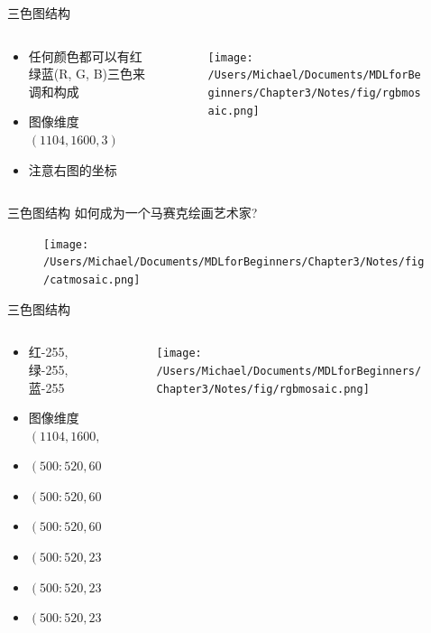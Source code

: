 \documentclass[handout]{beamer}
\begin{document}
\begin{frame}{三色图结构}
\begin{columns}
	\begin{column}{0.25\textwidth}
		\begin{itemize}
			\item \footnotesize{任何颜色都可以有红绿蓝(R, G, B)三色来调和构成}
			\item \footnotesize{图像维度 $(1104, 1600, 3)$}
			\item 注意右图的坐标
		\end{itemize}
	\end{column}
	\begin{column}{0.65\textwidth}
		\begin{figure}[H]
	\texttt{[image: /Users/Michael/Documents/MDLforBeginners/Chapter3/Notes/fig/rgbmosaic.png]}
\end{figure}	
	\end{column}
\end{columns}
\end{frame}

\begin{frame}{三色图结构}
	如何成为一个马赛克绘画艺术家?
	\begin{figure}[H]
		\centering
		\texttt{[image: /Users/Michael/Documents/MDLforBeginners/Chapter3/Notes/fig/catmosaic.png]}
	\end{figure}
\end{frame}

\begin{frame}{三色图结构}
\begin{columns}
	\begin{column}{0.35\textwidth}
		\begin{itemize}
			\item \footnotesize{红-255, 绿-255, 蓝-255}
			\item \footnotesize{图像维度 $(1104, 1600, 3)$}
			\item $(500:520, 600:620, 0)$
			\item $(500:520, 600:620, 1)$
			\item $(500:520, 600:620, 2)$
			\item $(500:520, 230:250, 0)$
			\item $(500:520, 230:250, 1)$
			\item $(500:520, 230:250, 2)$
		\end{itemize}
	\end{column}
	\begin{column}{0.65\textwidth}
		\begin{figure}[H]
	\texttt{[image: /Users/Michael/Documents/MDLforBeginners/Chapter3/Notes/fig/rgbmosaic.png]}
\end{figure}	
	\end{column}
\end{columns}
\end{frame}
\end{document}
